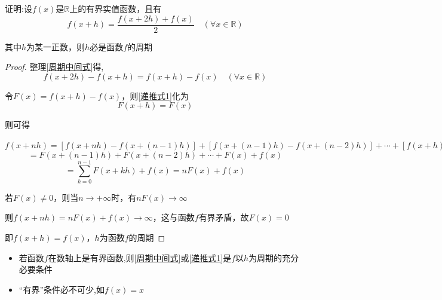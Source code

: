 \vspace{8pt}

\begin{example}
    证明:设$f(x)$是$\mathbb{R}$上的有界实值函数，且有
    \begin{equation}
        f(x+h)=\frac{f(x+2h)+f(x)}{2} \quad (\forall x\in \mathbb{R})   \label{周期中间式}
    \end{equation}

    其中$h$为某一正数，则$h$必是函数$f$的周期
\end{example}

\begin{proof}

    整理\ref{周期中间式}得,
    \begin{equation}
        f(x+2h)-f(x+h)=f(x+h)-f(x)\quad(\forall x\in \mathbb{R})    \label{递推式1}
    \end{equation}

    令$F(x)=f(x+h)-f(x)$，则\ref{递推式1}化为
    \begin{equation}
        F(x+h)=F(x)
    \end{equation}

    则可得

    $f(x+nh)=[f(x+nh)-f(x+(n-1)h)]+[f(x+(n-1)h)-f(x+(n-2)h)]+\cdots+[f(x+h)-f(x)]+f(x)$
    $$=F(x+(n-1)h)+F(x+(n-2)h)+\cdots+F(x)+f(x)$$
    \begin{equation*}
        =\sum_{k=0}^{n-1}F(x+kh)+f(x)=nF(x)+f(x)
    \end{equation*}

    若$F(x)\ne 0$，则当$n\to +\infty$时，有$nF(x)\to \infty$

    则$f(x+nh)=nF(x)+f(x)\to \infty$，这与函数$f$有界矛盾，故$F(x)=0$

    即$f(x+h)=f(x)$，$h$为函数$f$的周期
\end{proof}

\vspace{4pt}

\begin{note}
    \begin{itemize}
        \item 若函数$f$在数轴上是有界函数,则\ref{周期中间式}或\ref{递推式1}是$f$以$h$为周期的充分必要条件
        \item “有界”条件必不可少,如$f(x)=x$
    \end{itemize}
\end{note}

\vspace{6pt}

